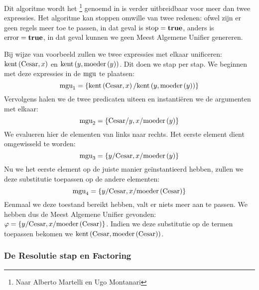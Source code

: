 Dit algoritme wordt het \footnote{Naar Alberto Martelli en Ugo Montanari} genoemd in is verder uitbreidbaar voor meer dan twee expressies. Het algoritme kan stoppen omwille van twee redenen: ofwel zijn er geen regels meer toe te passen, in dat geval is $\mbox{stop}=\mbox{\bf true}$, anders is $\mbox{error}=\mbox{\bf true}$, in dat geval kunnen we geen Meest Algemene Unifier genereren.
\begin{leftbar}
Bij wijze van voorbeeld zullen we twee expressies met elkaar unificeren: $\mbox{kent}\left( \mbox{Cesar},x \right)$ en $\mbox{kent}\left( y,\mbox{moeder}\left( y \right) \right)$. Dit doen we stap per stap. We beginnen met deze expressies in de $\mbox{mgu}$ te plaatsen:
\begin{equation}
\mbox{mgu}_1=\left\{\mbox{kent}\left( \mbox{Cesar},x \right)/\mbox{kent}\left( y,\mbox{moeder}\left( y \right) \right)\right\}
\end{equation}
Vervolgens halen we de twee predicaten uiteen en instanti\"eren we de argumenten met elkaar:
\begin{equation}
\mbox{mgu}_2=\left\{\mbox{Cesar}/y,x/\mbox{moeder}\left( y \right)\right\}
\end{equation}
We evalueren hier de elementen van links naar rechts. Het eerste element dient omgewisseld te worden:
\begin{equation}
\mbox{mgu}_3=\left\{y/\mbox{Cesar},x/\mbox{moeder}\left( y \right)\right\}
\end{equation}
Nu we het eerste element op de juiste manier ge\"instantieerd hebben, zullen we deze substitutie toepassen op de andere elementen:
\begin{equation}
\mbox{mgu}_4=\left\{y/\mbox{Cesar},x/\mbox{moeder}\left( \mbox{Cesar} \right)\right\}
\end{equation}
Eenmaal we deze toestand bereikt hebben, valt er niets meer aan te passen. We hebben dus de Meest Algemene Unifier gevonden: $\varphi=\left\{y/\mbox{Cesar},x/\mbox{moeder}\left( \mbox{Cesar} \right)\right\}$. Indien we deze substitutie op de termen toepassen bekomen we $\mbox{kent}\left( \mbox{Cesar},\mbox{moeder}\left( \mbox{Cesar} \right) \right)$.
\end{leftbar}
\subsubsection{De Resolutie stap en Factoring}
\label{sss:resolutionStep}
